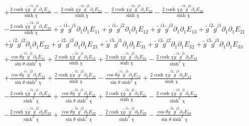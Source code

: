 \documentclass[10pt,letterpaper]{article}
\numberwithin{equation}{section}
\begin{document}
\begin{appendices}
\begin{eqnarray}
&& + \frac{2 \cosh\chi \tilde{g}^{i1} \tilde{g}^{j1} \partial_{1}E_{11}}{\sinh\chi} -  \frac{2 \cosh\chi \tilde{g}^{i2} \tilde{g}^{j2} \partial_{1}E_{22}}{\sinh\chi} -  \frac{2 \cosh\chi \tilde{g}^{i2} \tilde{g}^{j3} \partial_{1}E_{23}}{\sinh\chi} -  \frac{2 \cosh\chi \tilde{g}^{i3} \tilde{g}^{j2} \partial_{1}E_{32}}{\sinh\chi} \nonumber \\ 
&& -  \frac{2 \cosh\chi \tilde{g}^{i3} \tilde{g}^{j3} \partial_{1}E_{33}}{\sinh\chi} + \tilde{g}^{i1} \tilde{g}^{j1} \partial_{1}\partial_{1}E_{11} + \tilde{g}^{i1} \tilde{g}^{j2} \partial_{1}\partial_{1}E_{12} + \tilde{g}^{i1} \tilde{g}^{j3} \partial_{1}\partial_{1}E_{13} + \tilde{g}^{i2} \tilde{g}^{j1} \partial_{1}\partial_{1}E_{21} \nonumber \\ 
&& + \tilde{g}^{i2} \tilde{g}^{j2} \partial_{1}\partial_{1}E_{22} + \tilde{g}^{i2} \tilde{g}^{j3} \partial_{1}\partial_{1}E_{23} + \tilde{g}^{i3} \tilde{g}^{j1} \partial_{1}\partial_{1}E_{31} + \tilde{g}^{i3} \tilde{g}^{j2} \partial_{1}\partial_{1}E_{32} + \tilde{g}^{i3} \tilde{g}^{j3} \partial_{1}\partial_{1}E_{33} \nonumber \\ 
&& + \frac{\cos\theta \tilde{g}^{i1} \tilde{g}^{j1} \partial_{2}E_{11}}{\sin\theta \sinh^2\chi} + \frac{2 \cosh\chi \tilde{g}^{i2} \tilde{g}^{j1} \partial_{2}E_{11}}{\sinh\chi} + \frac{2 \cosh\chi \tilde{g}^{i1} \tilde{g}^{j2} \partial_{2}E_{11}}{\sinh\chi} -  \frac{2 \cosh\chi \tilde{g}^{i1} \tilde{g}^{j1} \partial_{2}E_{12}}{\sinh^3\chi} \nonumber \\ 
&& + \frac{\cos\theta \tilde{g}^{i1} \tilde{g}^{j2} \partial_{2}E_{12}}{\sin\theta \sinh^2\chi} + \frac{2 \cosh\chi \tilde{g}^{i2} \tilde{g}^{j2} \partial_{2}E_{12}}{\sinh\chi} -  \frac{\cos\theta \tilde{g}^{i1} \tilde{g}^{j3} \partial_{2}E_{13}}{\sin\theta \sinh^2\chi} + \frac{2 \cosh\chi \tilde{g}^{i2} \tilde{g}^{j3} \partial_{2}E_{13}}{\sinh\chi} \nonumber \\ 
&& -  \frac{2 \cosh\chi \tilde{g}^{i1} \tilde{g}^{j1} \partial_{2}E_{21}}{\sinh^3\chi} + \frac{\cos\theta \tilde{g}^{i2} \tilde{g}^{j1} \partial_{2}E_{21}}{\sin\theta \sinh^2\chi} + \frac{2 \cosh\chi \tilde{g}^{i2} \tilde{g}^{j2} \partial_{2}E_{21}}{\sinh\chi} -  \frac{2 \cosh\chi \tilde{g}^{i2} \tilde{g}^{j1} \partial_{2}E_{22}}{\sinh^3\chi} \nonumber \\ 
&& -  \frac{2 \cosh\chi \tilde{g}^{i1} \tilde{g}^{j2} \partial_{2}E_{22}}{\sinh^3\chi} + \frac{\cos\theta \tilde{g}^{i2} \tilde{g}^{j2} \partial_{2}E_{22}}{\sin\theta \sinh^2\chi} -  \frac{2 \cosh\chi \tilde{g}^{i1} \tilde{g}^{j3} \partial_{2}E_{23}}{\sinh^3\chi} -  \frac{\cos\theta \tilde{g}^{i2} \tilde{g}^{j3} \partial_{2}E_{23}}{\sin\theta \sinh^2\chi} \nonumber \\ 

\end{eqnarray}
\end{appendices}
\end{document}
